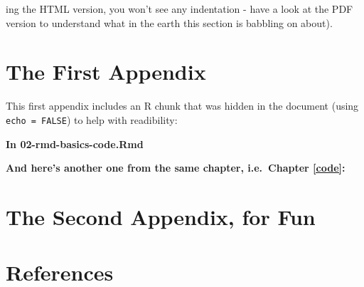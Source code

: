 \documentclass[a4paper, nobind]{templates/ociamthesis}
\begin{document}
ing the HTML version, you won't see any indentation - have a look at the PDF version to understand what in the earth this section is babbling on about).

\startappendices

\hypertarget{the-first-appendix}{%
\chapter{The First Appendix}\label{the-first-appendix}}

This first appendix includes an R chunk that was hidden in the document (using \texttt{echo\ =\ FALSE}) to help with readibility:

\textbf{In 02-rmd-basics-code.Rmd}

\textbf{And here's another one from the same chapter, i.e.~Chapter \ref{code}:}

\hypertarget{the-second-appendix-for-fun}{%
\chapter{The Second Appendix, for Fun}\label{the-second-appendix-for-fun}}

\hypertarget{references}{%
\chapter*{References}\label{references}}

\end{document}
